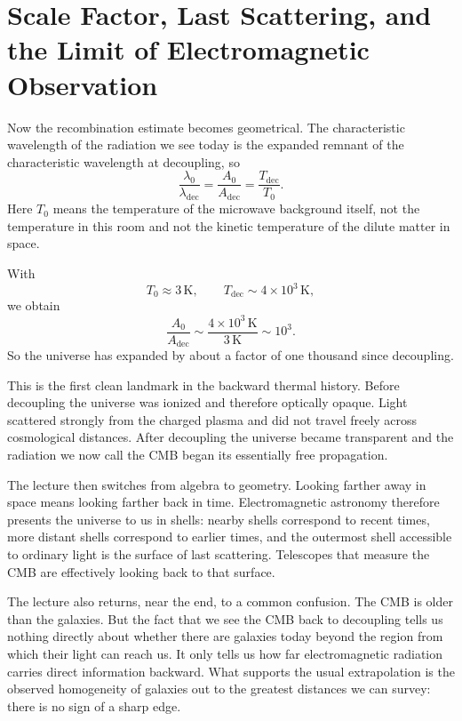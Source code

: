 \section{Scale Factor, Last Scattering, and the Limit of Electromagnetic Observation}

Now the recombination estimate becomes geometrical. The characteristic wavelength of the radiation we see today is the expanded remnant of the characteristic wavelength at decoupling, so
\begin{equation}
\frac{\lambda_0}{\lambda_{\mathrm{dec}}}
=
\frac{A_0}{A_{\mathrm{dec}}}
=
\frac{T_{\mathrm{dec}}}{T_0}.
\end{equation}
Here \(T_0\) means the temperature of the microwave background itself, not the temperature in this room and not the kinetic temperature of the dilute matter in space.

With
\[
T_0 \approx 3\,\mathrm{K},
\qquad
T_{\mathrm{dec}} \sim 4\times 10^3\,\mathrm{K},
\]
we obtain
\begin{equation}
\frac{A_0}{A_{\mathrm{dec}}}
\sim
\frac{4\times 10^3\,\mathrm{K}}{3\,\mathrm{K}}
\sim 10^3.
\end{equation}
So the universe has expanded by about a factor of one thousand since decoupling.

This is the first clean landmark in the backward thermal history. Before decoupling the universe was ionized and therefore optically opaque. Light scattered strongly from the charged plasma and did not travel freely across cosmological distances. After decoupling the universe became transparent and the radiation we now call the CMB began its essentially free propagation.

The lecture then switches from algebra to geometry. Looking farther away in space means looking farther back in time. Electromagnetic astronomy therefore presents the universe to us in shells: nearby shells correspond to recent times, more distant shells correspond to earlier times, and the outermost shell accessible to ordinary light is the surface of last scattering. Telescopes that measure the CMB are effectively looking back to that surface.

The lecture also returns, near the end, to a common confusion. The CMB is older than the galaxies. But the fact that we see the CMB back to decoupling tells us nothing directly about whether there are galaxies today beyond the region from which their light can reach us. It only tells us how far electromagnetic radiation carries direct information backward. What supports the usual extrapolation is the observed homogeneity of galaxies out to the greatest distances we can survey: there is no sign of a sharp edge.

